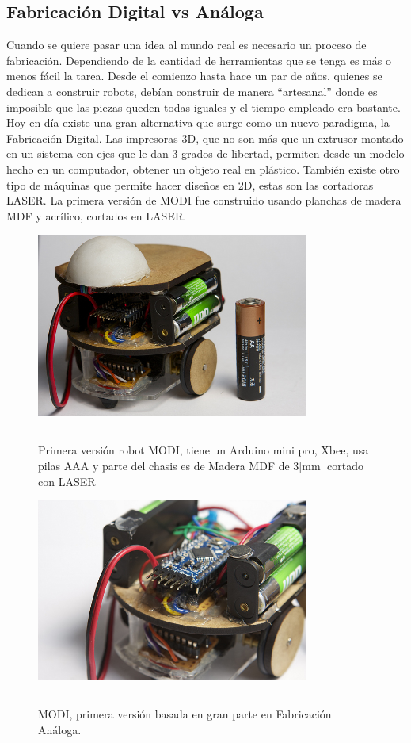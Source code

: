 \subsection{Fabricación Digital vs Análoga}
Cuando se quiere pasar una idea al mundo real es necesario un proceso de fabricación. Dependiendo de la cantidad de herramientas que se tenga es más o menos fácil la tarea. Desde el comienzo hasta hace un par de años, quienes se dedican a construir robots, debían construir de manera “artesanal” donde es imposible que las piezas queden todas iguales y el tiempo empleado era bastante. Hoy en día existe una gran alternativa que surge como un nuevo paradigma, la Fabricación Digital. Las impresoras 3D, que no son más que un extrusor montado en un sistema con ejes que le dan 3 grados de libertad, permiten desde un modelo hecho en un computador, obtener un objeto real en plástico. También existe otro tipo de máquinas que permite hacer diseños en 2D, estas son las cortadoras LASER. La primera versión de MODI fue construido usando planchas de madera MDF y acrílico, cortados en LASER.

\begin{figure}[htbp]
	\centering
		\includegraphics[width=0.8\textwidth]{./Pictures/MODIrev1.jpg}
		\rule{35em}{0.5pt}
	\caption[modirev1]{Primera versión robot MODI, tiene un Arduino mini pro, Xbee, usa pilas AAA y parte del chasis es de Madera MDF de 3[mm] cortado con LASER}
	\label{fig:modirev1}
\end{figure}

\begin{figure}[htbp]
	\centering
		\includegraphics[width=0.8\textwidth]{./Pictures/2MODIrev1.jpg}
		\rule{35em}{0.5pt}
	\caption[modirev2]{MODI, primera versión basada en gran parte en Fabricación Análoga.}
	\label{fig:modirev2}
\end{figure}

